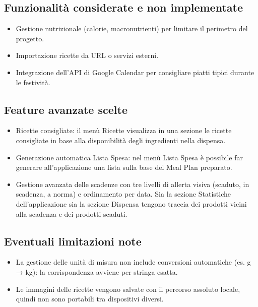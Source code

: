\documentclass[a4paper, 12pt]{article}
\begin{document}
\newpage

\subsection{Funzionalità considerate e non implementate}
\begin{itemize}
    \item Gestione nutrizionale (calorie, macronutrienti) per limitare il perimetro del progetto.
    \item Importazione ricette da URL o servizi esterni.
    \item Integrazione dell'API di Google Calendar per consigliare piatti tipici durante le festività.
\end{itemize}


\subsection{Feature avanzate scelte}
\begin{itemize}
    \item Ricette consigliate: il menù Ricette visualizza in una sezione le ricette consigliate in base alla disponibilità degli ingredienti nella dispensa.
    \item Generazione automatica Lista Spesa: nel menù Lista Spesa è possibile far generare all’applicazione una lista sulla base del Meal Plan preparato.
    \item Gestione avanzata delle scadenze con tre livelli di allerta visiva (scaduto, in scadenza, a norma) e ordinamento per data. Sia la sezione Statistiche dell’applicazione sia la sezione Dispensa tengono traccia dei prodotti vicini alla scadenza e dei prodotti scaduti. 
\end{itemize}

\subsection{Eventuali limitazioni note}
\begin{itemize}
    \item La gestione delle unità di misura non include conversioni automatiche (es. g → kg): la corrispondenza avviene per stringa esatta.
    \item Le immagini delle ricette vengono salvate con il percorso assoluto locale, quindi non sono portabili tra dispositivi diversi.
\end{itemize}

\newpage
\end{document}
